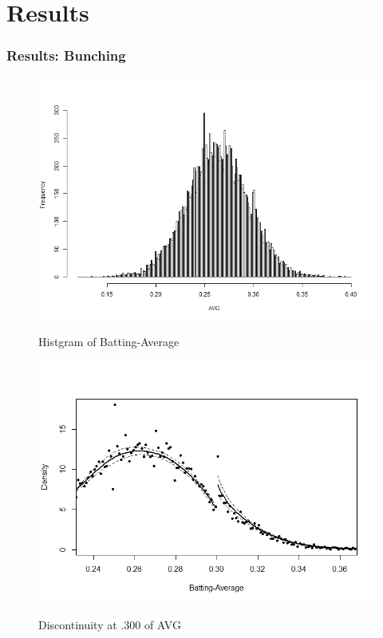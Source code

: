 \documentclass[dvipdfmx,12pt]{beamer}
\begin{document}
\section{Results}
\begin{frame}\frametitle{Results: Bunching}
  \begin{figure}
    \centering
    \caption{Histgram of Batting-Average}        \includegraphics[keepaspectratio, scale = 0.35, angle=0]{graphs/hist_AVG_all.png}
    \label{AVG_Histgram}
  \end{figure}

\end{frame}

\begin{frame}
  \begin{figure}
    \centering
    \caption{Discontinuity at .300 of AVG}
    \includegraphics[keepaspectratio, scale = 0.5, angle = 0]{graphs/AVG_300.png}
    \label{DCdensity_AVG_300}

  \end{figure}
\end{frame}
\end{document}
